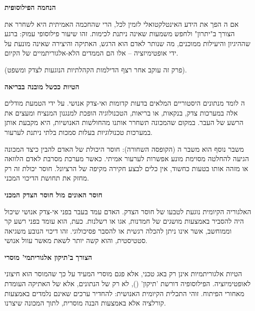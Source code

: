 \textbf{ הנחמה הפילוסופית}

אם ה הפך את הידע האינטלקטואלי לזמין לכל, הרי שהחכמה האמיתית היא לשחרר את הצורך ב"יתרון" ולחפש משמעות שאינה ניתנת לכימות. זהו שיעור פילוסופי עמוק: ברגע שההיגיון והיעילות ממוכנים, מה שנותר לאדם הוא הרגש, האתיקה והיצירה שאינה מונעת על ידי אופטימיזציה – אלו הם הממדים הלא-אלגוריתמיים של הקיום.


(פרק זה עוקב אחר רצף הדילמות הקהלתיות הנוגעות לצדק ומשפט).

\textbf{ הטיות ככשל מובנה בבריאה}

ה לומד מנתונים היסטוריים המלאים בדעות קדומות ואי-צדק אנושי. על ידי הטמעת מודלים אלה במערכות צדק, בנקאות, או בריאות, הטכנולוגיה הופכת למנגנון המנציח ומעצים את הרשע של העבר. במקום שהמכונה תשחרר אותנו מהחולשות האנושיות, היא מקבעת אותן במערכות טכנולוגיות בעלות סמכות בלתי ניתנת לערעור.

משבר נוסף הוא משבר ה (הקופסה השחורה): חוסר היכולת של האדם להבין כיצד המכונה הגיעה להחלטה מסוימת מונע אפשרות לערעור אמיתי. כאשר מערכת  מסרבת לאדם הלוואה או מזהה אותו בטעות כחשוד, אין כלים לבצע חקירה מקיפה של הרציונל. חוסר יכולת זה רק מחזק את תחושת הדיכוי המכני.

\textbf{ חוסר האונים מול חוסר הצדק המכני}

האלגוריה הקיומית נוגעת לטבעו של חוסר הצדק. האדם עמד בעבר בפני אי-צדק אנושי שיכול היה להסביר באמצעות מושגים של חמדנות, אגו או רשלנות. כעת, הוא עומד בפני רשע קר וממוחשב, אשר אינו ניתן להכלה רגשית או להסבר פסיכולוגי. זהו דיכוי הנובע משגיאה סטטיסטית, והוא קשה יותר לשאת מאשר עוול אנושי.

\textbf{ הצורך ב'תיקון אלגוריתמי' מוסרי}

הטיות אלגוריתמיות אינן רק באג טכני, אלא פגם מוסרי המעיד על כך שהמוסר הוא חיצוני לאופטימיזציה. הפילוסופיה דורשת 'תיקון' (), לא רק של הנתונים, אלא של האתיקה העומדת מאחורי הפיתוח. זוהי התכלית הקיומית האנושית: להחדיר ערכים שאינם נלמדים באמצעות קורלציה אלא באמצעות הבנה מוסרית, לתוך המכונה שיצרנו.
